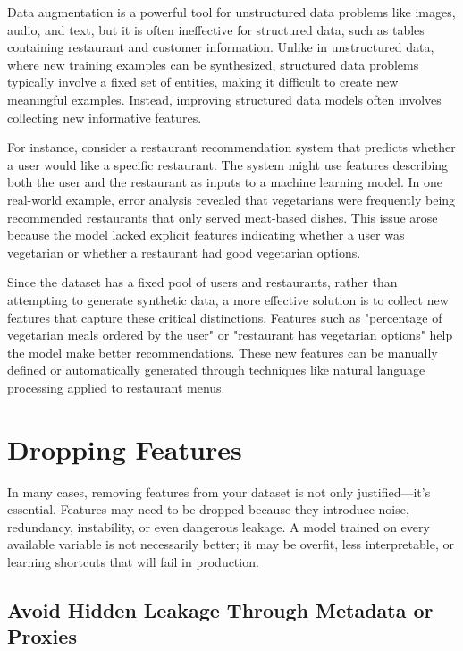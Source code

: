 \documentclass[12pt,openany, draft]{book}
\begin{document}
Data augmentation is a powerful tool for unstructured data problems like images, audio, and text, but it is often ineffective for structured data, such as tables containing restaurant and customer information. Unlike in unstructured data, where new training examples can be synthesized, structured data problems typically involve a fixed set of entities, making it difficult to create new meaningful examples. Instead, improving structured data models often involves collecting new informative features. \newline

\begin{examplebox}
For instance, consider a restaurant recommendation system that predicts whether a user would like a specific restaurant. The system might use features describing both the user and the restaurant as inputs to a machine learning model. In one real-world example, error analysis revealed that vegetarians were frequently being recommended restaurants that only served meat-based dishes. This issue arose because the model lacked explicit features indicating whether a user was vegetarian or whether a restaurant had good vegetarian options.
\end{examplebox} 

Since the dataset has a fixed pool of users and restaurants, rather than attempting to generate synthetic data, a more effective solution is to collect new features that capture these critical distinctions. Features such as "percentage of vegetarian meals ordered by the user" or "restaurant has vegetarian options" help the model make better recommendations. These new features can be manually defined or automatically generated through techniques like natural language processing applied to restaurant menus. 



\section{Dropping Features}

In many cases, removing features from your dataset is not only justified—it’s essential. Features may need to be dropped because they introduce noise, redundancy, instability, or even dangerous leakage. A model trained on every available variable is not necessarily better; it may be overfit, less interpretable, or learning shortcuts that will fail in production.

\subsection{Avoid Hidden Leakage Through Metadata or Proxies}
\end{document}
